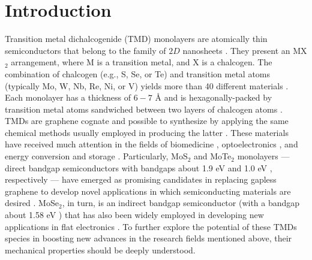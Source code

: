 \documentclass[a4paper,fleqn]{cas-sc}
\begin{document}
\section{Introduction}

Transition metal dichalcogenide (TMD) monolayers are atomically thin semiconductors that belong to the family of $2D$ nanosheets \cite{manzeli20172d,chhowalla2013chemistry}. They present an MX$_{2}$ arrangement, where M is a transition metal, and X is a chalcogen. The combination of chalcogen (e.g., S, Se, or Te) and transition metal atoms (typically Mo, W, Nb, Re, Ni, or V) yields more than 40 different materials \cite{tan2015two,chhowalla2015two}. Each monolayer has a thickness of $6-7$ \r{A} and is hexagonally-packed by transition metal atoms sandwiched between two layers of chalcogen atoms \cite{tan2015two}. TMDs are graphene cognate and possible to synthesize by applying the same chemical methods usually employed in producing the latter \cite{xu2013graphene,butler2013progress}. These materials have received much attention in the fields of biomedicine \cite{qian2015two,chen2015two}, optoelectronics \cite{wang2012electronics,wilson1969transition}, and energy conversion and storage \cite{eda2011photoluminescence,yun2018three}. Particularly, MoS$_2$ and MoTe$_2$ monolayers --- direct bandgap semiconductors with bandgaps about 1.9 eV \cite{mak2010atomically} and 1.0 eV \cite{ruppert2014optical}, respectively --- have emerged as promising candidates in replacing gapless graphene to develop novel applications in which semiconducting materials are desired \cite{jariwala2014emerging}. MoSe$_2$, in turn, is an indirect bandgap semiconductor (with a bandgap about 1.58 eV \cite{zhang2014direct}) that has also been widely employed in developing new applications in flat electronics \cite{eftekhari2017molybdenum,eda2013two}. To further explore the potential of these TMDs species in boosting new advances in the research fields mentioned above, their mechanical properties should be deeply understood. 
\end{document}
